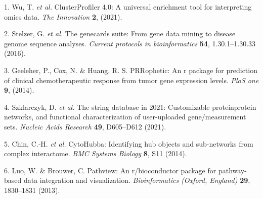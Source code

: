 \documentclass[
]{article}
\newenvironment{cslreferences}%
  {}%
  {\par}
\begin{document}
\hypertarget{refs}{}
\begin{cslreferences}
\leavevmode\hypertarget{ref-ClusterprofilerWuTi2021}{}%
1. Wu, T. \emph{et al.} ClusterProfiler 4.0: A universal enrichment tool for interpreting omics data. \emph{The Innovation} \textbf{2}, (2021).

\leavevmode\hypertarget{ref-TheGenecardsSStelze2016}{}%
2. Stelzer, G. \emph{et al.} The genecards suite: From gene data mining to disease genome sequence analyses. \emph{Current protocols in bioinformatics} \textbf{54}, 1.30.1--1.30.33 (2016).

\leavevmode\hypertarget{ref-PrropheticAnGeeleh2014}{}%
3. Geeleher, P., Cox, N. \& Huang, R. S. PRRophetic: An r package for prediction of clinical chemotherapeutic response from tumor gene expression levels. \emph{PloS one} \textbf{9}, (2014).

\leavevmode\hypertarget{ref-TheStringDataSzklar2021}{}%
4. Szklarczyk, D. \emph{et al.} The string database in 2021: Customizable proteinprotein networks, and functional characterization of user-uploaded gene/measurement sets. \emph{Nucleic Acids Research} \textbf{49}, D605--D612 (2021).

\leavevmode\hypertarget{ref-CytohubbaIdenChin2014}{}%
5. Chin, C.-H. \emph{et al.} CytoHubba: Identifying hub objects and sub-networks from complex interactome. \emph{BMC Systems Biology} \textbf{8}, S11 (2014).

\leavevmode\hypertarget{ref-PathviewAnRLuoW2013}{}%
6. Luo, W. \& Brouwer, C. Pathview: An r/bioconductor package for pathway-based data integration and visualization. \emph{Bioinformatics (Oxford, England)} \textbf{29}, 1830--1831 (2013).
\end{cslreferences}
\end{document}
